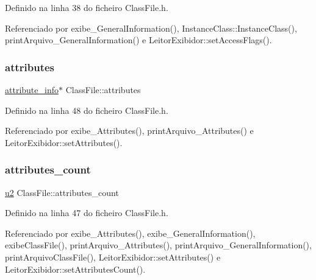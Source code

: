 Definido na linha 38 do ficheiro Class\+File.\+h.



Referenciado por exibe\+\_\+\+General\+Information(), Instance\+Class\+::\+Instance\+Class(), print\+Arquivo\+\_\+\+General\+Information() e Leitor\+Exibidor\+::set\+Access\+Flags().

\mbox{\label{classClassFile_a8bf809db8e1008f401dc3cda5e9cdb14}} 
\subsubsection{\texorpdfstring{attributes}{attributes}}
{\footnotesize\ttfamily \hyperlink{structattribute__info}{attribute\+\_\+info}$\ast$ Class\+File\+::attributes}



Definido na linha 48 do ficheiro Class\+File.\+h.



Referenciado por exibe\+\_\+\+Attributes(), print\+Arquivo\+\_\+\+Attributes() e Leitor\+Exibidor\+::set\+Attributes().

\mbox{\label{classClassFile_a633c696fbe08e7e7906b2ab1e52f3d1b}} 
\subsubsection{\texorpdfstring{attributes\+\_\+count}{attributes\_count}}
{\footnotesize\ttfamily \hyperlink{BasicTypes_8h_a732cde1300aafb73b0ea6c2558a7a54f}{u2} Class\+File\+::attributes\+\_\+count}



Definido na linha 47 do ficheiro Class\+File.\+h.



Referenciado por exibe\+\_\+\+Attributes(), exibe\+\_\+\+General\+Information(), exibe\+Class\+File(), print\+Arquivo\+\_\+\+Attributes(), print\+Arquivo\+\_\+\+General\+Information(), print\+Arquivo\+Class\+File(), Leitor\+Exibidor\+::set\+Attributes() e Leitor\+Exibidor\+::set\+Attributes\+Count().

\mbox{\label{classClassFile_a2309d843091aad79aed04ce92470a434}} 
